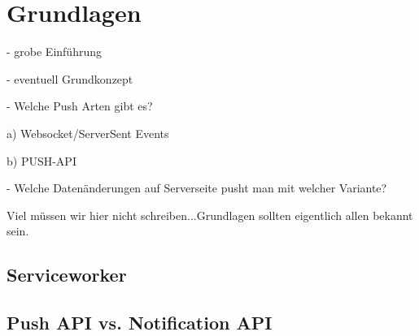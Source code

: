 \chapter{Grundlagen}

- grobe Einführung 

- eventuell Grundkonzept

- Welche Push Arten gibt es?

  a) Websocket/ServerSent Events
  
  b) PUSH-API

- Welche Datenänderungen auf Serverseite pusht man mit welcher Variante?

Viel müssen wir hier nicht schreiben...Grundlagen sollten eigentlich allen bekannt sein.

\section{Serviceworker}

\section{Push API vs. Notification API}


